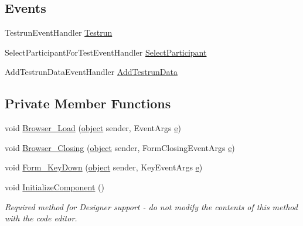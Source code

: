 \subsection*{Events}
\begin{DoxyCompactItemize}
\item 
Testrun\+Event\+Handler \hyperlink{class_web_analyzer_1_1_u_i_1_1_testrun_form_ac07b8e3d6b66e219b067dcacd1535f2c}{Testrun}
\item 
Select\+Participant\+For\+Test\+Event\+Handler \hyperlink{class_web_analyzer_1_1_u_i_1_1_testrun_form_a18eca3a8ed7f598778799921d9564428}{Select\+Participant}
\item 
Add\+Testrun\+Data\+Event\+Handler \hyperlink{class_web_analyzer_1_1_u_i_1_1_testrun_form_a29bd18b6bcaf8b884378062e278b99b1}{Add\+Testrun\+Data}
\end{DoxyCompactItemize}
\subsection*{Private Member Functions}
\begin{DoxyCompactItemize}
\item 
void \hyperlink{class_web_analyzer_1_1_u_i_1_1_testrun_form_a4aa6a7286bfa93d7d2c45b479fefb83c}{Browser\+\_\+\+Load} (\hyperlink{_u_i_2_h_t_m_l_resources_2js_2lib_2underscore_8min_8js_aae18b7515bb2bc4137586506e7c0c903}{object} sender, Event\+Args \hyperlink{_u_i_2_h_t_m_l_resources_2js_2lib_2bootstrap_8min_8js_ab5902775854a8b8440bcd25e0fe1c120}{e})
\item 
void \hyperlink{class_web_analyzer_1_1_u_i_1_1_testrun_form_a38560e38393db64121ca23fcc1c88120}{Browser\+\_\+\+Closing} (\hyperlink{_u_i_2_h_t_m_l_resources_2js_2lib_2underscore_8min_8js_aae18b7515bb2bc4137586506e7c0c903}{object} sender, Form\+Closing\+Event\+Args \hyperlink{_u_i_2_h_t_m_l_resources_2js_2lib_2bootstrap_8min_8js_ab5902775854a8b8440bcd25e0fe1c120}{e})
\item 
void \hyperlink{class_web_analyzer_1_1_u_i_1_1_testrun_form_a9497cf8d3047cf4241612981d1296136}{Form\+\_\+\+Key\+Down} (\hyperlink{_u_i_2_h_t_m_l_resources_2js_2lib_2underscore_8min_8js_aae18b7515bb2bc4137586506e7c0c903}{object} sender, Key\+Event\+Args \hyperlink{_u_i_2_h_t_m_l_resources_2js_2lib_2bootstrap_8min_8js_ab5902775854a8b8440bcd25e0fe1c120}{e})
\item 
void \hyperlink{class_web_analyzer_1_1_u_i_1_1_testrun_form_a3fb351d4d2131410a47bc886f0104789}{Initialize\+Component} ()
\begin{DoxyCompactList}\small\item\em Required method for Designer support -\/ do not modify the contents of this method with the code editor. \end{DoxyCompactList}\end{DoxyCompactItemize}
